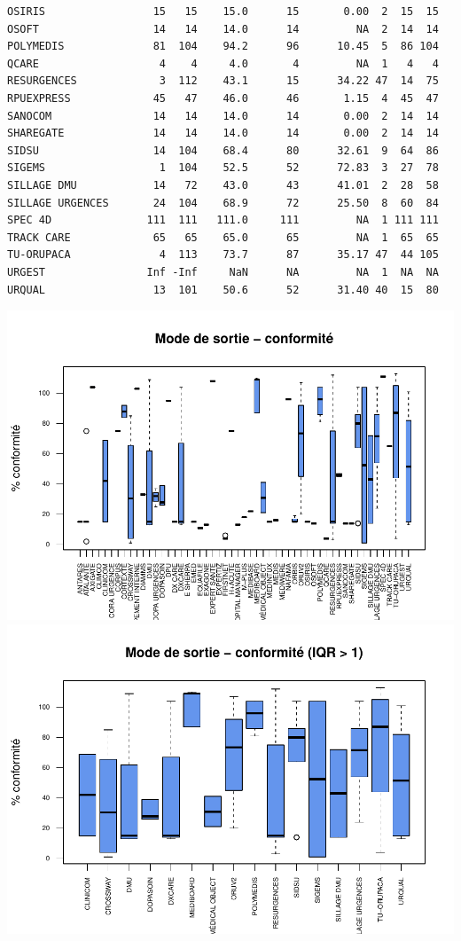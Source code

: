 \documentclass[]{article}
\begin{document}
\begin{verbatim}
OSIRIS                 15   15    15.0      15       0.00  2  15  15
OSOFT                  14   14    14.0      14         NA  2  14  14
POLYMEDIS              81  104    94.2      96      10.45  5  86 104
QCARE                   4    4     4.0       4         NA  1   4   4
RESURGENCES             3  112    43.1      15      34.22 47  14  75
RPUEXPRESS             45   47    46.0      46       1.15  4  45  47
SANOCOM                14   14    14.0      14       0.00  2  14  14
SHAREGATE              14   14    14.0      14       0.00  2  14  14
SIDSU                  14  104    68.4      80      32.61  9  64  86
SIGEMS                  1  104    52.5      52      72.83  3  27  78
SILLAGE DMU            14   72    43.0      43      41.01  2  28  58
SILLAGE URGENCES       24  104    68.9      72      25.50  8  60  84
SPEC 4D               111  111   111.0     111         NA  1 111 111
TRACK CARE             65   65    65.0      65         NA  1  65  65
TU-ORUPACA              4  113    73.7      87      35.17 47  44 105
URGEST                Inf -Inf     NaN      NA         NA  1  NA  NA
URQUAL                 13  101    50.6      52      31.40 40  15  80
\end{verbatim}

\includegraphics{septembre2015_files/figure-latex/unnamed-chunk-29-1.pdf}
\includegraphics{septembre2015_files/figure-latex/unnamed-chunk-29-2.pdf}
\end{document}
